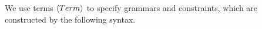 \documentclass[english,a4paper,10pt]{article}
\begin{document}
We use terms $\left\langle Term\right\rangle$ to specify grammars and constraints,
which are constructed by the following syntax.
\begin{comment}
\begin{alignat*}{1}
 & \begin{array}{rcl}
\term & ::= & \qualidentifier\\
 & | & \literal\\
 & | & \paren{\qualidentifier\mbox{ }\kplus{\term}}\\
 & | & \paren{\existskwd\mbox{ }\paren{\kplus{\sortedvar}}\mbox{ }\term}\\
 & | & \paren{\forallkwd\mbox{ }\paren{\kplus{\sortedvar}}\mbox{ }\term}\\
 & | & \paren{\letkwd\mbox{ }\paren{\kplus{\varbinding}}\mbox{ }\term}\\[2ex]
 \bfterm & ::= & \qualidentifier\\
 & | & \literal\\
 & | & \paren{\qualidentifier\mbox{ }\kplus{\bfterm}}\\[2ex]
 \qualidentifier & ::= & \identifier\mbox{ }|\mbox{ }\paren{\askwd\mbox{ }\identifier\mbox{ }\sortexpr}\\
 \sortedvar & ::= & \paren{\symbol\mbox{ }\sortexpr}\\
 \varbinding & ::= & \paren{\symbol\mbox{ }\term}\\
\end{array}
\end{alignat*}
Above,
we distinguish a subclass of \emph{binder-free} terms $\bfterm$ in the syntax above,
which do not contain bound (local) variables.
Identifiers that comprise terms
may be \emph{qualified} with a type-cast, using the keyword $\askwd$.
Type casts are used for symbols whose type is ambiguous,
such as parametric datatype constructors, e.g. the nil constructor
for a parametric list.

Like sorts, the identifiers that comprise terms
can either be defined by the user or by background theories.
Examples of the latter are given in \cref{ssec:smt-logic}.
\end{comment}
\end{document}
